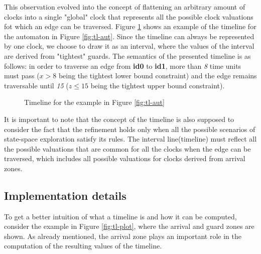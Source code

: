 This observation evolved into the concept of flattening an arbitrary amount of clocks into a single "global" clock that represents all the possible clock valuations fot which an edge can be traversed. Figure \ref{fig:tl-1} shows an example of the timeline for the automaton in Figure \ref{fig:tl-aut}. Since the timeline can always be represented by one clock, we choose to draw it as an interval, where the values of the interval are derived from "tightest" guards. The semantics of the presented timeline is as follows: in order to traverse an edge from \textbf{id0} to \textbf{id1}, more than \textit{8} time units must pass ($x>8$ being the tightest lower bound constraint) and the edge remains traversable until \textit{15} ($z \leq 15$ being the tightest upper bound constraint).

\begin{figure}
\centering
{}

\caption{Timeline for the example in Figure \ref{fig:tl-aut}} \label{fig:tl-1}
\end{figure}

It is important to note that the concept of the timeline is also supposed to consider the fact that the refinement holds only when all the possible scenarios of state-space exploration satisfy its rules. The interval line(timeline) must reflect all the possible valuations that are common for all the clocks when the edge can be traversed, which includes all possible valuations for clocks derived from arrival zones.

\subsection{Implementation details}
To get a better intuition of what a timeline is and how it can be computed, consider the example in Figure \ref{fig:tl-plot}, where the arrival and guard zones are shown. As already mentioned, the arrival zone plays an important role in the computation of the resulting values of the timeline. 

